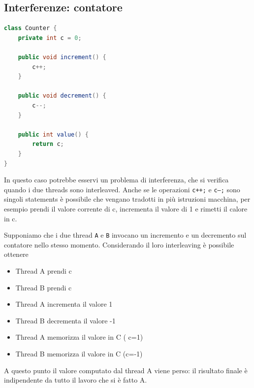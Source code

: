 \documentclass{article}
\begin{document}
\subsection{Interferenze: contatore}
\begin{lstlisting}[language=Java]
class Counter {
    private int c = 0;

    public void increment() {
        c++;
    }

    public void decrement() {
        c--;
    }

    public int value() {
        return c;
    }
}
\end{lstlisting}
In questo caso potrebbe esservi un problema di interferenza, che si verifica quando i due threads sono interleaved. Anche se le operazioni \texttt{c++;} e \texttt{c--;} sono singoli statements \`e possibile che vengano tradotti in pi\`u istruzioni macchina, per esempio prendi il valore corrente di c, incrementa il valore di 1 e rimetti il calore in c.



Supponiamo che i due thread \texttt{A} e \texttt{B} invocano un incremento e un decremento sul contatore nello stesso momento. Considerando il loro interleaving \`e possibile ottenere
\begin{itemize}
\item Thread A prendi c
\item Thread B prendi c
\item Thread A incrementa il valore 1
\item Thread B decrementa il valore -1
\item Thread A memorizza il valore in C ( c=1)
\item Thread B memorizza il valore in C (c=-1)
\end{itemize}
A questo punto il valore computato dal thread A viene perso: il risultato finale \`e indipendente da tutto il lavoro che si \`e fatto A. 
\end{document}
